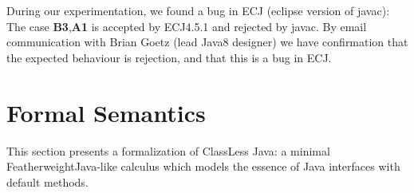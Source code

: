 During our experimentation, we found a bug in ECJ (eclipse version of javac): The case \textbf{B3},\textbf{A1}
is accepted by ECJ4.5.1 and rejected by javac.
By email communication with Brian Goetz (lead Java8 designer) we have confirmation that the expected behaviour is rejection, and that this is a bug in ECJ.




\section{Formal Semantics}\label{sec:formal}

This section presents a formalization of ClassLess Java: a minimal
FeatherweightJava-like calculus which models the essence of Java 
interfaces with default methods. 

